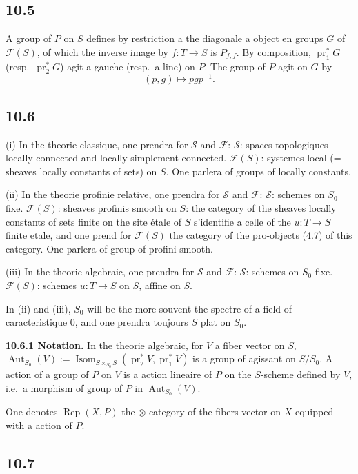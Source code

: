 \documentclass[12pt,a4paper]{article}
\theoremstyle{plain}
\theoremstyle{definition}
\theoremstyle{remark}
\DeclareMathOperator{\Isom}{Isom}
\DeclareMathOperator{\Aut}{Aut}
\DeclareMathOperator{\pr}{pr}
\DeclareMathOperator{\Rep}{Rep}
\begin{document}
\subsection*{10.5}

A group of $P$ on $S$ defines by restriction a the diagonale a object en groups $G$ of $\mathcal{F}(S)$, of which the inverse image by $f: T \to S$ is $P_{f,f}$. By composition, $\pr_1^* G$ (resp.~$\pr_2^* G$) agit a gauche (resp.~a line) on $P$. The group of $P$ agit on $G$ by
$$(p, g) \longmapsto pgp^{-1}.$$

\subsection*{10.6}

(i) In the theorie classique, one prendra for $\mathcal{S}$ and $\mathcal{F}$:
$\mathcal{S}$: spaces topologiques locally connected and locally simplement connected.
$\mathcal{F}(S)$: systemes local (= sheaves locally constants of sets) on $S$.
One parlera of groups of locally constants.

(ii) In the theorie profinie relative, one prendra for $\mathcal{S}$ and $\mathcal{F}$:
$\mathcal{S}$: schemes on $S_0$ fixe.
$\mathcal{F}(S)$: sheaves profinis smooth on $S$: the category of the sheaves locally constants of sets finite on the site étale of $S$ s'identifie a celle of the $u: T \to S$ finite etale, and one prend for $\mathcal{F}(S)$ the category of the pro-objects (4.7) of this category.
One parlera of group of profini smooth.

(iii) In the theorie algebraic, one prendra for $\mathcal{S}$ and $\mathcal{F}$:
$\mathcal{S}$: schemes on $S_0$ fixe.
$\mathcal{F}(S)$: schemes $u: T \to S$ on $S$, affine on $S$.

In (ii) and (iii), $S_0$ will be the more souvent the spectre of a field of caracteristique 0, and one prendra toujours $S$ plat on $S_0$.

\textbf{10.6.1 Notation.} In the theorie algebraic, for $V$ a fiber vector on $S$, $\Aut_{S_0}(V) := \Isom_{S \times_{S_0} S}(\pr_2^* V, \pr_1^* V)$ is a group of agissant on $S/S_0$. A action of a group of $P$ on $V$ is a action lineaire of $P$ on the $S$-scheme defined by $V$, i.e.~a morphism of group of $P$ in $\Aut_{S_0}(V)$.

One denotes $\Rep(X, P)$ the $\otimes$-category of the fibers vector on $X$ equipped with a action of $P$.

\subsection*{10.7}
\end{document}
